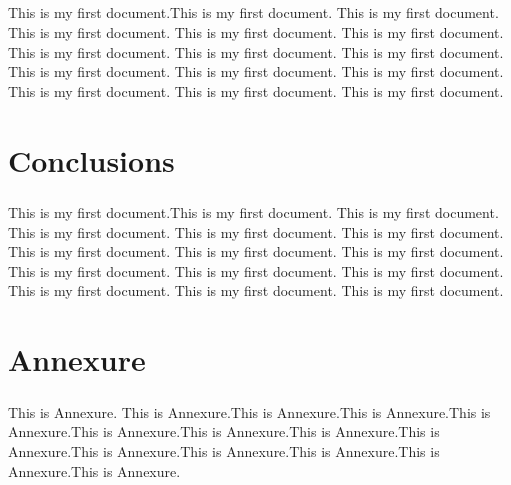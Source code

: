 \documentclass{report}
\begin{document}
	\paragraph{}
	
	This is my first document.This is my first document. This is my first document. This is my first document. This is my first document. This is my first document. This is my first document. This is my first document. This is my first document. This is my first document. This is my first document. This is my first document. This is my first document. This is my first document. This is my first document.
	
	\chapter{Conclusions}
	\paragraph{}
	
	This is my first document.This is my first document. This is my first document. This is my first document. This is my first document. This is my first document. This is my first document. This is my first document. This is my first document. This is my first document. This is my first document. This is my first document. This is my first document. This is my first document. This is my first document.
	
	\chapter{Annexure}
	\setcounter{page}{1}
	
	\paragraph{}
	
	This is Annexure. This is Annexure.This is Annexure.This is Annexure.This is Annexure.This is Annexure.This is Annexure.This is Annexure.This is Annexure.This is Annexure.This is Annexure.This is Annexure.This is Annexure.This is Annexure.
	
\end{document}
